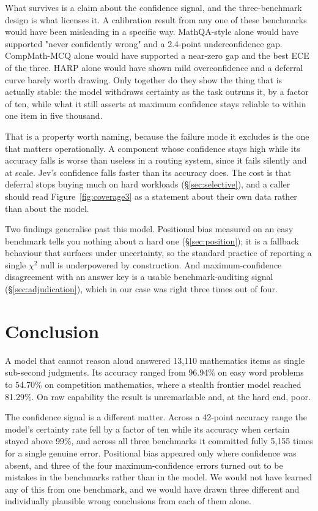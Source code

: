 \documentclass[11pt]{article}
\begin{document}
What survives is a claim about the confidence signal, and the three-benchmark design is what licenses it. A calibration result from any one of these benchmarks would have been misleading in a specific way. MathQA-style alone would have supported "never confidently wrong" and a 2.4-point underconfidence gap. CompMath-MCQ alone would have supported a near-zero gap and the best ECE of the three. HARP alone would have shown mild overconfidence and a deferral curve barely worth drawing. Only together do they show the thing that is actually stable: the model withdraws certainty as the task outruns it, by a factor of ten, while what it still asserts at maximum confidence stays reliable to within one item in five thousand.

That is a property worth naming, because the failure mode it excludes is the one that matters operationally. A component whose confidence stays high while its accuracy falls is worse than useless in a routing system, since it fails silently and at scale. Jev's confidence falls faster than its accuracy does. The cost is that deferral stops buying much on hard workloads (\S\ref{sec:selective}), and a caller should read Figure~\ref{fig:coverage3} as a statement about their own data rather than about the model.

Two findings generalise past this model. Positional bias measured on an easy benchmark tells you nothing about a hard one (\S\ref{sec:position}); it is a fallback behaviour that surfaces under uncertainty, so the standard practice of reporting a single $\chi^2$ null is underpowered by construction. And maximum-confidence disagreement with an answer key is a usable benchmark-auditing signal (\S\ref{sec:adjudication}), which in our case was right three times out of four.

\section{Conclusion}

A model that cannot reason aloud answered 13,110 mathematics items as single sub-second judgments. Its accuracy ranged from 96.94\% on easy word problems to 54.70\% on competition mathematics, where a stealth frontier model reached 81.29\%. On raw capability the result is unremarkable and, at the hard end, poor.

The confidence signal is a different matter. Across a 42-point accuracy range the model's certainty rate fell by a factor of ten while its accuracy when certain stayed above 99\%, and across all three benchmarks it committed fully 5,155 times for a single genuine error. Positional bias appeared only where confidence was absent, and three of the four maximum-confidence errors turned out to be mistakes in the benchmarks rather than in the model. We would not have learned any of this from one benchmark, and we would have drawn three different and individually plausible wrong conclusions from each of them alone.
\end{document}
